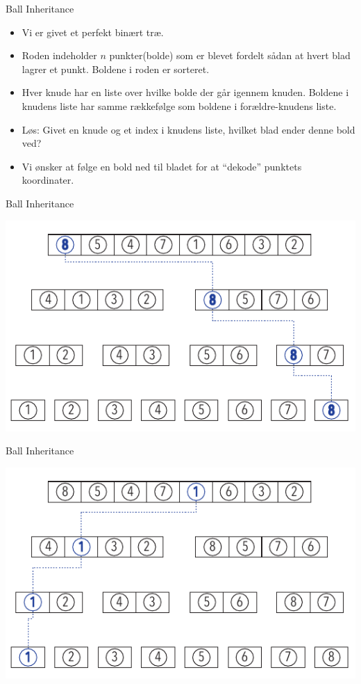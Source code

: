 \documentclass[pdf]{beamer}
\begin{document}
\begin{frame}{Ball Inheritance}

  \begin{itemize}
    \item Vi er givet et perfekt binært træ.
      \pause
    \item Roden indeholder $n$ punkter(bolde) som er blevet fordelt sådan at hvert blad lagrer et punkt. Boldene i roden er sorteret.
      \pause
    \item Hver knude har en liste over hvilke bolde der går igennem knuden. Boldene i knudens liste har samme rækkefølge som boldene i forældre-knudens liste.
     \pause
    \item Løs: Givet en knude og et index i knudens liste, hvilket blad ender denne bold ved?
     \pause
    \item Vi ønsker at følge en bold ned til bladet for at ``dekode'' punktets koordinater.

  \end{itemize}
\end{frame}

\begin{frame}{Ball Inheritance}
  \begin{center}
    \includegraphics[scale=1.0]{pictures/bolde_8.pdf}
  \end{center}
\end{frame}


\begin{frame}{Ball Inheritance}
  \begin{center}
    \includegraphics[scale=1.0]{pictures/bolde_1.pdf}
  \end{center}
\end{frame}
\end{document}
